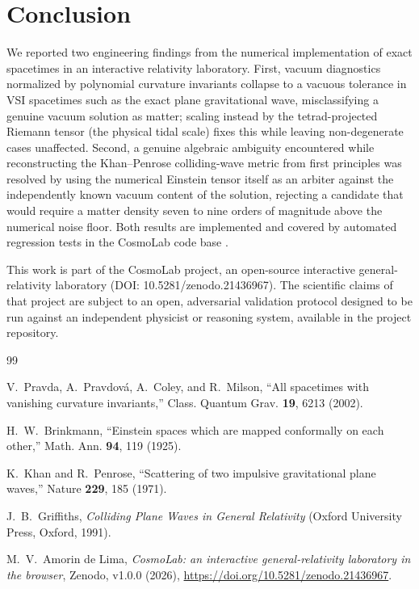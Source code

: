 \documentclass[aps,onecolumn,10pt,nofootinbib]{revtex4-2}
\begin{document}
\section{Conclusion}

We reported two engineering findings from the numerical implementation of
exact spacetimes in an interactive relativity laboratory. First, vacuum
diagnostics normalized by polynomial curvature invariants collapse to a
vacuous tolerance in VSI spacetimes such as the exact plane gravitational
wave, misclassifying a genuine vacuum solution as matter; scaling instead
by the tetrad-projected Riemann tensor (the physical tidal scale) fixes
this while leaving non-degenerate cases unaffected. Second, a genuine
algebraic ambiguity encountered while reconstructing the Khan--Penrose
colliding-wave metric from first principles was resolved by using the
numerical Einstein tensor itself as an arbiter against the independently
known vacuum content of the solution, rejecting a candidate that would
require a matter density seven to nine orders of magnitude above the
numerical noise floor. Both results are implemented and covered by
automated regression tests in the CosmoLab code base
\cite{CosmoLab}.

\begin{acknowledgments}
This work is part of the CosmoLab project, an open-source interactive
general-relativity laboratory (DOI: 10.5281/zenodo.21436967). The
scientific claims of that project are subject to an open, adversarial
validation protocol designed to be run against an independent physicist
or reasoning system, available in the project repository.
\end{acknowledgments}

\begin{thebibliography}{99}

V.~Pravda, A.~Pravdov\'a, A.~Coley, and R.~Milson,
``All spacetimes with vanishing curvature invariants,''
Class. Quantum Grav. \textbf{19}, 6213 (2002).

H.~W.~Brinkmann,
``Einstein spaces which are mapped conformally on each other,''
Math. Ann. \textbf{94}, 119 (1925).

K.~Khan and R.~Penrose,
``Scattering of two impulsive gravitational plane waves,''
Nature \textbf{229}, 185 (1971).

J.~B.~Griffiths,
\emph{Colliding Plane Waves in General Relativity}
(Oxford University Press, Oxford, 1991).

M.~V.~Amorin de Lima,
\emph{CosmoLab: an interactive general-relativity laboratory in the browser},
Zenodo, v1.0.0 (2026), \url{https://doi.org/10.5281/zenodo.21436967}.

\end{thebibliography}
\end{document}
